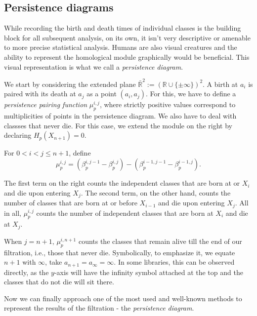 \subsection{Persistence diagrams}
While recording the birth and death times of individual classes is the building block for all subsequent analysis, on its own, it isn't very descriptive or amenable to more precise statistical analysis. Humans are also visual creatures and the ability to represent the homological module graphically would be beneficial. This visual representation is what we call a \textit{persistence diagram}.

We start by considering the extended plane $\bar{\mathbb{R}}^{2} := (\mathbb{R} \cup \{\pm \infty\})^{2}$. A birth at $a_{i}$ is paired with its death at $a_{j}$ as a point $(a_{i}, a_{j})$. For this, we have to define a \textit{persistence pairing function} $\mu^{i,j}_{p}$, where strictly positive values correspond to multiplicities of points in the persistence diagram. We also have to deal with classses that never die. For this case, we extend the module on the right by declaring $H_{p}(X_{n+1}) = 0$.

\begin{definition}
For $0 < i < j \leq n+1$, define
  \begin{equation*}
    \mu^{i,j}_{p} = (\beta^{i, j-1}_{p} - \beta^{i,j}_{p}) - (\beta^{i-1, j-1}_{p} - \beta^{i-1, j}_{p}).
  \end{equation*}
\end{definition}

The first term on the right counts the independent classes that are born at or $X_{i}$ and die upon entering $X_{j}$. The second term, on the other hand, counts the number of classes that are born at or before $X_{i-1}$ and die upon entering $X_{j}$. All in all, $\mu^{i,j}_{p}$ counts the number of independent classes that are born at $X_{i}$ and die at $X_{j}$.

When $j = n+1$, $\mu^{i, n+1}_{p}$ counts the classes that remain alive till the end of our filtration, i.e., those that never die. Symbolically, to emphasize it, we equate $n+1$ with $\infty$, take $a_{n+1} = a_{\infty} = \infty$. In some libraries, this can be observed directly, as the $y$-axis will have the infinity symbol attached at the top and the classes that do not die will sit there.

Now we can finally approach one of the most used and well-known methods to represent the results of the filtration - the \textit{persistence diagram}.

